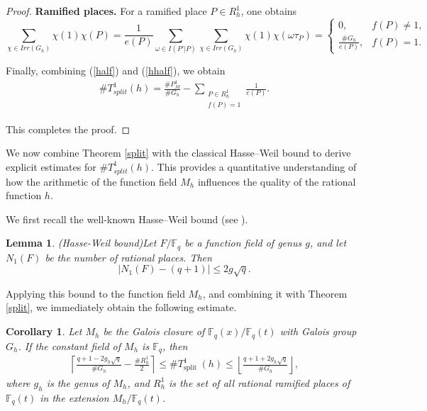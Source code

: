 \documentclass[1p,final]{elsarticle}
\newtheorem{lemma}[theorem]{Lemma}
\newtheorem{corollary}[theorem]{Corollary}
\newtheorem{open problem}[theorem]{Open Problem}
\begin{document}
\begin{proof}
\medskip

\noindent
\textbf{Ramified places.}
For a ramified place $P\in R_{h}^1$, one obtains
\begin{equation}\label{hhalf}
\sum_{\chi\in Irr(G_{h}) }\chi(1)\chi(P)
=
\frac{1}{e(P)}\sum_{\omega \in I(P'|P)} \sum_{\chi\in Irr(G_{h}) }\chi (1) \chi(\omega \tau_P)
=
\left\{
\begin{array}{cl}
0, &  f(P) \neq 1,  \\
\displaystyle\frac{\#G_{h}}{e(P)}, & f(P) = 1.
\end{array}
\right.
\end{equation}

\medskip

Finally, combining (\ref{half}) and (\ref{hhalf}), we obtain
\begin{equation}\label{fi}
\begin{aligned}
\# T^1_{split}(h)
=
\frac{\#P^1_M}{\#G_h}
-
\sum_{\substack{P \in R_h^1\\ f(P)=1}} \frac{1}{e(P)}.
\end{aligned}
\end{equation}

This completes the proof.
\end{proof}


We now combine Theorem \ref{split} with the classical Hasse--Weil bound to derive explicit estimates for $\#T^1_{split}(h)$. This provides a quantitative understanding of how the arithmetic of the function field $M_h$ influences the quality of the rational function $h$.

\medskip

We first recall the well-known Hasse--Weil bound (see \cite{Stichtenoth2009}).

\begin{lemma}{(Hasse-Weil bound)}\label{hasse}
Let $F/\mathbb{F}_{q}$ be a function field of genus $g$, and let $N_{1}(F)$ be the number of rational places. Then 
\begin{equation}
|N_{1}(F)-(q+1)| \leq 2g\sqrt{q}.
\end{equation}  
\end{lemma}

\medskip

Applying this bound to the function field $M_h$, and combining it with Theorem \ref{split}, we immediately obtain the following estimate.

\begin{corollary}\label{estimate}
Let $M_{h}$ be the Galois closure of $\mathbb{F}_q(x)/\mathbb{F}_q(t)$ with Galois group $G_{h}$. If the constant field of $M_{h}$ is $\mathbb{F}_q$, then
\begin{equation}\label{es}
\begin{gathered}
\left \lceil   \frac{q+1-2 g_h \sqrt{q}}{\# G_{h}}-\frac{\# R^1_h }{2}\right \rceil
\leq \# T_{\text {split }}^1(h) \leq \left \lfloor   \frac{q+1+2 g_h \sqrt{q}}{\# G_{h}} \right \rfloor,
\end{gathered}
\end{equation}
where $g_h$ is the genus of $M_{h}$, and $R^1_h$ is the set of all rational ramified places of $\mathbb{F}_q(t)$ in the extension $M_{h}/ \mathbb{F}_q(t)$.
\end{corollary}
\end{document}
